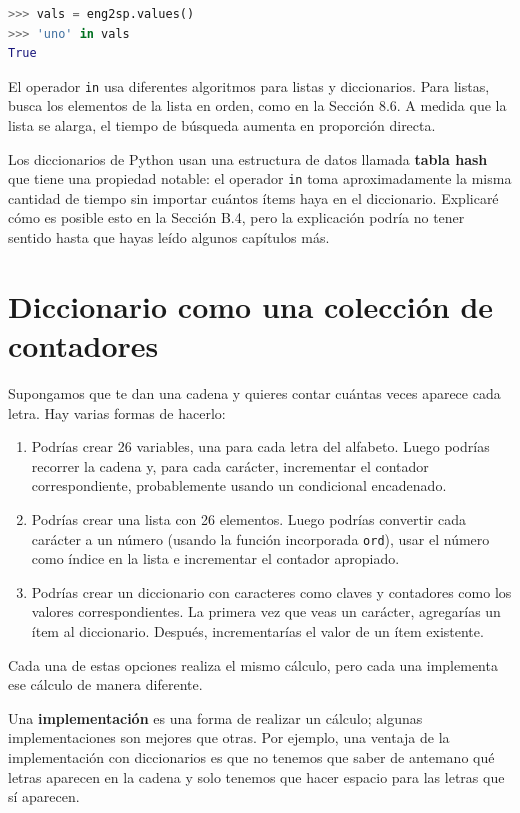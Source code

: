 \begin{lstlisting}[language=Python]
>>> vals = eng2sp.values()
>>> 'uno' in vals
True
\end{lstlisting}

El operador \texttt{in} usa diferentes algoritmos para listas y diccionarios. Para listas, busca los elementos de la lista en orden, como en la Sección 8.6. A medida que la lista se alarga, el tiempo de búsqueda aumenta en proporción directa.

Los diccionarios de Python usan una estructura de datos llamada \textbf{tabla hash} que tiene una propiedad notable: el operador \texttt{in} toma aproximadamente la misma cantidad de tiempo sin importar cuántos ítems haya en el diccionario. Explicaré cómo es posible esto en la Sección B.4, pero la explicación podría no tener sentido hasta que hayas leído algunos capítulos más.

\section{Diccionario como una colección de contadores}

Supongamos que te dan una cadena y quieres contar cuántas veces aparece cada letra. Hay varias formas de hacerlo:

\begin{enumerate}
    \item Podrías crear 26 variables, una para cada letra del alfabeto. Luego podrías recorrer la cadena y, para cada carácter, incrementar el contador correspondiente, probablemente usando un condicional encadenado.
    \item Podrías crear una lista con 26 elementos. Luego podrías convertir cada carácter a un número (usando la función incorporada \texttt{ord}), usar el número como índice en la lista e incrementar el contador apropiado.
    \item Podrías crear un diccionario con caracteres como claves y contadores como los valores correspondientes. La primera vez que veas un carácter, agregarías un ítem al diccionario. Después, incrementarías el valor de un ítem existente.
\end{enumerate}

Cada una de estas opciones realiza el mismo cálculo, pero cada una implementa ese cálculo de manera diferente.

Una \textbf{implementación} es una forma de realizar un cálculo; algunas implementaciones son mejores que otras. Por ejemplo, una ventaja de la implementación con diccionarios es que no tenemos que saber de antemano qué letras aparecen en la cadena y solo tenemos que hacer espacio para las letras que sí aparecen.

